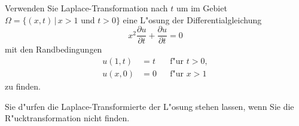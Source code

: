 Verwenden Sie Laplace-Transformation nach $t$ um
im Gebiet $\Omega=\{(x,t)\,|\, x > 1 \text{ und } t > 0\}$ eine
L"osung der Differentialgleichung
\begin{equation}
x^2\frac{\partial u}{\partial t}+\frac{\partial u}{\partial t}=0
\label{50000011:dgl}
\end{equation}
mit den Randbedingungen
\begin{equation}
\begin{aligned}
u(1,t)&=t& &\text{f"ur $t>0$},\\
u(x,0)&=0& &\text{f"ur $x > 1$}
\end{aligned}
\label{50000011:rb}
\end{equation}
zu finden.

\begin{hinweis}
Sie d"urfen die Laplace-Transformierte der L"osung stehen lassen, wenn Sie
die R"ucktransformation nicht finden.
\end{hinweis}

